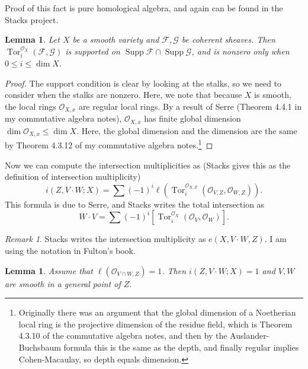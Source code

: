 \documentclass[leqno, openany]{memoir}
\newtheorem{lem}[thm]{Lemma}
\theoremstyle{definition}
\theoremstyle{remark}
\newtheorem{rmk}[thm]{Remark}
\theoremstyle{plain}
\theoremstyle{definition}
\theoremstyle{remark}
\newcommand{\mc}[1]{\mathcal{#1}}
\DeclareMathOperator{\Supp}{Supp}
\DeclareMathOperator{\Tor}{Tor}
\begin{document}
Proof of this fact is pure homological algebra, and again can be found in the
Stacks project.

\begin{lem} Let $X$ be a smooth variety and $\mc{F}, \mc{G}$ be coherent
sheaves. Then $\Tor_i^{\mc{O}_X}(\mc{F}, \mc{G})$ is supported on $\Supp \mc{F}
\cap \Supp \mc{G}$, and is nonzero only when $0 \leq i \leq \dim X$.  \end{lem}

\begin{proof} The support condition is clear by looking at the stalks, so we
    need to consider when the stalks are nonzero. Here, we note that because
    $X$ is smooth, the local rings $\mc{O}_{X,x}$ are regular local rings. By a
    result of Serre (Theorem 4.4.1 in my commutative algebra notes),
    $\mc{O}_{X,x}$ has finite global dimension $\dim \mc{O}_{X,x} \leq \dim X$.
    Here, the global dimension and the dimension are the same by Theorem 4.3.12
    of my commutative algebra notes.\footnote{Originally there was an argument
    that the global dimension of a Noetherian local ring is the projective
dimension of the residue field, which is Theorem 4.3.10 of the commutative
algebra notes, and then by the Auslander-Buchsbaum formula this is the same as
the depth, and finally regular implies Cohen-Macaulay, so depth equals
dimension.} \end{proof}

Now we can compute the intersection multiplicities as (Stacks gives this as the
definition of intersection multiplicity) \[ i(Z, V \cdot W; X) = \sum {(-1)}^i
\ell( \Tor_i^{\mc{O}_{X,Z}} (\mc{O}_{V,Z}, \mc{O}_{W,Z}) ). \] This formula is
due to Serre, and Stacks writes the total intersection as \[ W \cdot V = \sum
    {(-1)}^i [\Tor_i^{\mc{O}_X}(\mc{O}_V, \mc{O}_W)]. \] \begin{rmk} Stacks
    writes the intersection multiplicity as $e(X, V \cdot W, Z)$. I am using
    the notation in Fulton's book.  \end{rmk}

\begin{lem} Assume that $\ell(\mc{O}_{V \cap W, Z}) = 1$. Then $i(Z, V \cdot W;
X) = 1$ and $V, W$ are smooth in a general point of $Z$.  \end{lem}
\end{document}
